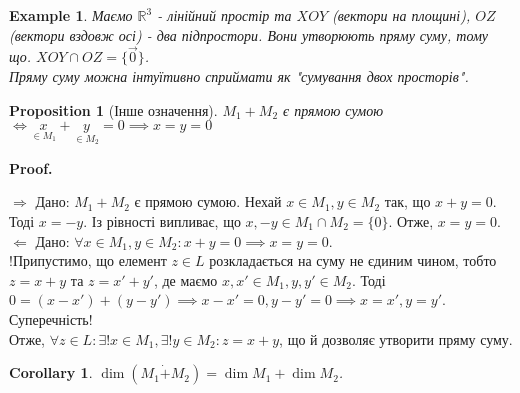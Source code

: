 \documentclass[a4paper, 10pt]{article}
\makeatletter
\def\rightproof{$\boxed{\Rightarrow}$ }
\def\leftproof{$\boxed{\Leftarrow}$ }
\theoremstyle{theoremdd}
\newtheorem{example}[theorem]{Example}
\newtheorem{proposition}[theorem]{Proposition}
\newtheorem{corollary}[theorem]{Corollary}
\renewenvironment{proof}[1][Proof.\\]{\par
\pushQED{\hfill \qed}%
\normalfont \topsep6\p@\@plus6\p@\relax
\trivlist
\item\relax
{\bfseries
#1\@addpunct{.}}\hspace\labelsep\ignorespaces
}{%
\popQED\endtrivlist\@endpefalse
}
\makeatother
\begin{document}
	\begin{example}
	Маємо $\mathbb{R}^3$ - лінійний простір та $XOY$ (вектори на площині), $OZ$ (вектори вздовж осі) - два підпростори. Вони утворюють пряму суму, тому що. $XOY \cap OZ = \{\vec{0}\}$.\\
	Пряму суму можна інтуїтивно сприймати як "сумування двох просторів".
	\end{example}
	
	\begin{proposition}[Інше означення]
	$M_1+M_2$ є прямою сумою $\iff \underset{\in M_1}{x}+\underset{\in M_2}{y} = 0 \implies x=y=0$
	\end{proposition}
	
	\begin{proof}
	\rightproof Дано: $M_1+M_2$ є прямою сумою. Нехай $x \in M_1, y \in M_2$ так, що $x + y = 0$.\\
	Тоді $x = -y$. Із рівності випливає, що $x,-y \in M_1 \cap M_2 = \{0\}$. Отже, $x = y = 0$.
	\bigskip \\
	\leftproof Дано: $\forall x \in M_1, y \in M_2: x+y=0 \implies x=y=0$.\\
	!Припустимо, що елемент $z \in L$ розкладається на суму не єдиним чином, тобто \\
	$z = x+y$ та $z = x'+y'$, де маємо $x,x' \in M_1, y,y' \in M_2$. Тоді\\
	$0 = (x-x') + (y-y') \implies x-x'=0, y-y'=0 \implies x=x', y=y'$. Суперечність!\\
	Отже, $\forall z \in L: \exists ! x \in M_1, \exists ! y \in M_2: z = x+y$, що й дозволяє утворити пряму суму.
	\end{proof}
	
	\begin{corollary}
	$\dim{(M_1 \dot{+} M_2)} = \dim{M_1} + \dim{M_2}$.
	\end{corollary}
	
\end{document}

